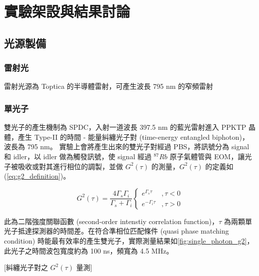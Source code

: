 \documentclass[class=NCU_thesis, crop=false]{standalone}
\begin{document}
\chapter{實驗架設與結果討論}

\section{光源製備}

\subsection{雷射光}
雷射光源為 Toptica 的半導體雷射，可產生波長 795 nm 的窄頻雷射

\subsection{單光子}
\label{subsection:single_photon}
雙光子的產生機制為 SPDC，入射一道波長 397.5 nm 的藍光雷射進入 PPKTP 晶體，產生 Type-II 的時間 - 能量糾纏光子對 (time-energy entangled biphoton)，波長為 795 nm。
實驗上會將產生出來的雙光子對經過 PBS，將訊號分為 signal 和 idler，以 idler 做為觸發訊號，使 signal 經過 $^{87}Rb$ 原子氣體管與 EOM，讓光子被吸收或對其進行相位的調製，並做 $G^{2}(\tau)$ 的測量，$G^{2}(\tau)$ 的定義如 (\ref{eq:g2_definition})。

\begin{equation}
    G^{2}(\tau)=\frac{4\Gamma_{s}\Gamma_{i}}{\Gamma_{s}+\Gamma_{i}}\left\{\begin{matrix}
        e^{\Gamma_{s}\tau} & ,\tau<0\\
        e^{-\Gamma_{i}\tau} & ,\tau>0
        \end{matrix}\right.
\label{eq:g2_definition}
\end{equation}

此為二階強度關聯函數 (second-order intenstiy correlation function)，$\tau$ 為兩顆單光子抵達探測器的時間差。在符合準相位匹配條件 (quasi phase matching condition) 時能最有效率的產生雙光子，實際測量結果如\cref{fig:single_photon_g2}，此光子之時間波包寬度約為 100 ns，頻寬為 4.5 MHz。

[糾纏光子對之 $G^{2}(\tau)$ 量測]
\end{document}
